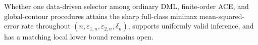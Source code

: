 Whether one data-driven selector among ordinary DML, finite-order ACE, and global-contour procedures attains the sharp full-class minimax mean-squared-error rate throughout \((n,\varepsilon_{1,n},\varepsilon_{2,n},\delta_n)\), supports uniformly valid inference, and has a matching local lower bound remains open.